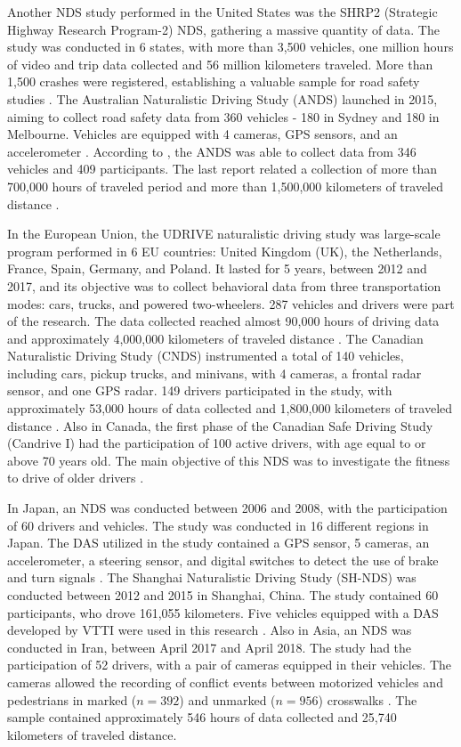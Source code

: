Another NDS study performed in the United States was the SHRP2 (Strategic Highway Research Program-2) NDS, gathering a massive quantity of data. The study was conducted in 6 states, with more than 3,500 vehicles, one million hours of video and trip data collected and 56 million kilometers traveled. More than 1,500 crashes were registered, establishing a valuable sample for road safety studies \cite{Njord2015}. The Australian Naturalistic Driving Study (ANDS) launched in 2015, aiming to collect road safety data from 360 vehicles - 180 in Sydney and 180 in Melbourne. Vehicles are equipped with 4 cameras, GPS sensors, and an accelerometer \cite{ANDS2017a}. According to \textcite{Larue2019}, the ANDS was able to collect data from 346 vehicles and 409 participants. The last report related a collection of more than 700,000 hours of traveled period and more than 1,500,000 kilometers of traveled distance \cite{ANDS2017a}. 

In the European Union, the UDRIVE naturalistic driving study was large-scale program performed in 6 EU countries: United Kingdom (UK), the Netherlands, France, Spain, Germany, and Poland. It lasted for 5 years, between 2012 and 2017, and its objective was to collect behavioral data from three transportation modes: cars, trucks, and powered two-wheelers. 287 vehicles and drivers were part of the research. The data collected reached almost 90,000 hours of driving data and approximately 4,000,000 kilometers of traveled distance \cite{VanNes2019}. The Canadian Naturalistic Driving Study (CNDS) instrumented a total of 140 vehicles, including cars, pickup trucks, and minivans, with 4 cameras, a frontal radar sensor, and one GPS radar. 149 drivers participated in the study, with approximately 53,000 hours of data collected and 1,800,000 kilometers of traveled distance \cite{CNDS2021}. Also in Canada, the first phase of the Canadian Safe Driving Study (Candrive I) had the participation of 100 active drivers, with age equal to or above 70 years old. The main objective of this NDS was to investigate the fitness to drive of older drivers \cite{Marshall2013}. 


In Japan, an NDS was conducted between 2006 and 2008, with the participation of 60 drivers and vehicles. The study was conducted in 16 different regions in Japan. The DAS utilized in the study contained a GPS sensor, 5 cameras, an accelerometer, a steering sensor, and digital switches to detect the use of brake and turn signals \cite{Uchida2010}. The Shanghai Naturalistic Driving Study (SH-NDS) was conducted between 2012 and 2015 in Shanghai, China. The study contained 60 participants, who drove 161,055 kilometers. Five vehicles equipped with a DAS developed by VTTI were used in this research \cite{Zhu2018}. Also in Asia, an NDS was conducted in Iran, between April 2017 and April 2018. The study had the participation of 52 drivers, with a pair of cameras equipped in their vehicles. The cameras allowed the recording of conflict events between motorized vehicles and pedestrians in marked ($n = 392$) and unmarked ($n = 956$) crosswalks \cite{Sheykhfard2021}. The sample contained approximately 546 hours of data collected and 25,740 kilometers of traveled distance.

